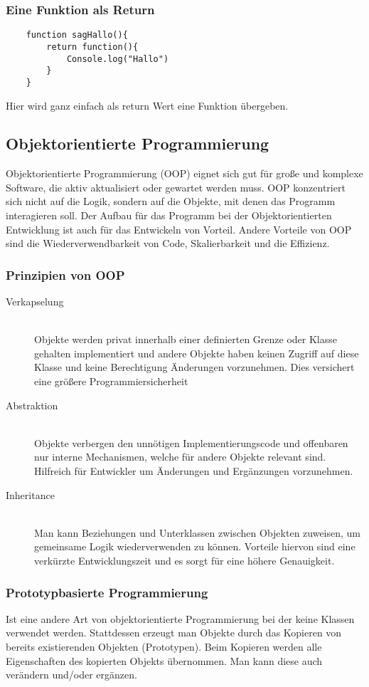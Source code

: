\subsubsection{Eine Funktion als Return}
\begin{lstlisting}
    function sagHallo(){
        return function(){
            Console.log("Hallo")
        }
    }
\end{lstlisting}
Hier wird ganz einfach als return Wert eine Funktion übergeben.

\subsection{Objektorientierte Programmierung}
Objektorientierte Programmierung (OOP) eignet sich gut für große und komplexe Software, die aktiv 
aktualisiert oder gewartet werden muss. OOP konzentriert sich nicht auf die Logik, sondern auf die 
Objekte, mit denen das Programm interagieren soll. Der Aufbau für das Programm bei der 
Objektorientierten Entwicklung ist auch für das Entwickeln von Vorteil. Andere Vorteile von OOP 
sind die Wiederverwendbarkeit von Code, Skalierbarkeit und die Effizienz.~\cite{OOP}

\subsubsection{Prinzipien von OOP}
\begin{description}
\item[Verkapselung]\hfill \\
 Objekte werden privat innerhalb einer definierten Grenze oder Klasse gehalten implementiert und 
 andere Objekte haben keinen Zugriff auf diese Klasse und keine Berechtigung
 Änderungen vorzunehmen. Dies versichert eine größere Programmiersicherheit
\item[Abstraktion]\hfill \\
Objekte verbergen den unnötigen Implementierungscode und offenbaren nur interne Mechanismen, welche 
für andere Objekte relevant sind. Hilfreich für Entwickler um Änderungen und Ergänzungen vorzunehmen.
\item[Inheritance]\hfill \\
Man kann Beziehungen und Unterklassen zwischen Objekten zuweisen, um gemeinsame Logik 
wiederverwenden zu können. Vorteile hiervon sind eine verkürzte Entwicklungszeit und 
es sorgt für eine höhere Genauigkeit.
\end{description}

\subsubsection{Prototypbasierte Programmierung}
Ist eine andere Art von objektorientierte Programmierung bei der keine Klassen verwendet werden. 
Stattdessen erzeugt man Objekte durch das Kopieren von bereits existierenden Objekten (Prototypen). 
Beim Kopieren werden alle Eigenschaften des kopierten Objekts übernommen. 
Man kann diese auch verändern und/oder ergänzen.